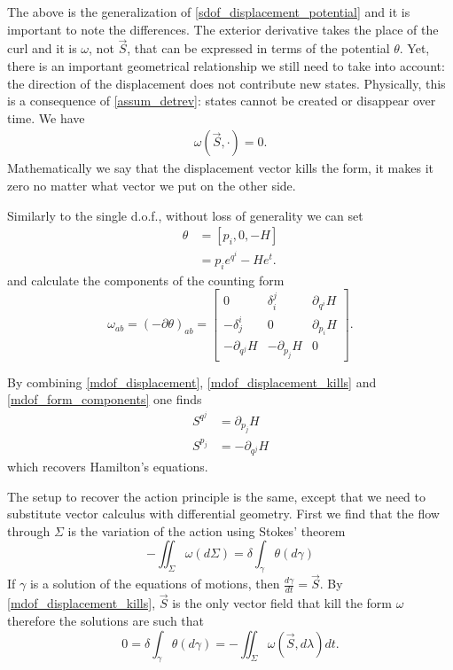 \documentclass[10pt,twocolumn, nofootinbib]{revtex4-2}
\begin{document}
The above is the generalization of \ref{sdof_displacement_potential} and it is important to note the differences. The exterior derivative takes the place of the curl and it is $\omega$, not $\vec{S}$, that can be expressed in terms of the potential $\theta$. Yet, there is an important geometrical relationship we still need to take into account: the direction of the displacement does not contribute new states. Physically, this is a consequence of \ref{assum_detrev}: states cannot be created or disappear over time. We have
\begin{align}\label{mdof_displacement_kills}
	\omega(\vec{S}, \cdot) = 0.
\end{align}
Mathematically we say that the displacement vector kills the form, it makes it zero no matter what vector we put on the other side.

Similarly to the single d.o.f., without loss of generality we can set
\begin{equation}\label{mdof_potential_expression}
\begin{aligned}
	\theta &= [p_i, 0, -H] \\
	&= p_i e^{q^i} - H e^t.
\end{aligned}
\end{equation}
and calculate the components of the counting form
\begin{equation}\label{mdof_form_components}
	\omega_{ab} = (-\partial\theta)_{ab} = \begin{bmatrix}
		0 & \delta^j_i & \partial_{q^i} H \\
		-\delta^i_j & 0 & \partial_{p_i} H \\
		-\partial_{q^j} H & -\partial_{p_j} H & 0
	\end{bmatrix}.
\end{equation}

By combining \ref{mdof_displacement}, \ref{mdof_displacement_kills} and \ref{mdof_form_components} one finds
\begin{equation}\label{mdof_Ham_eq}
\begin{aligned}
	S^{q^j} &= \partial_{p_j} H \\
	S^{p_j} &= - \partial_{q^j} H
\end{aligned}
\end{equation}
which recovers Hamilton's equations.

The setup to recover the action principle is the same, except that we need to substitute vector calculus with differential geometry. First we find that the flow through $\Sigma$ is the variation of the action using Stokes' theorem
\begin{equation}\label{mdof_action}
	- \iint_{\Sigma} \omega(d\Sigma) = \delta \int_{\gamma} \theta(d\gamma) 
\end{equation}
If $\gamma$ is a solution of the equations of motions, then $\frac{d\gamma}{dt} = \vec{S}$. By \ref{mdof_displacement_kills}, $\vec{S}$ is the only vector field that kill the form $\omega$ therefore the solutions are such that
\begin{equation}\label{mdof_stationary_action}
		0 = \delta \int_{\gamma} \theta(d\gamma) = - \iint_{\Sigma} \omega(\vec{S}, d\lambda) dt. 
\end{equation}
\end{document}

